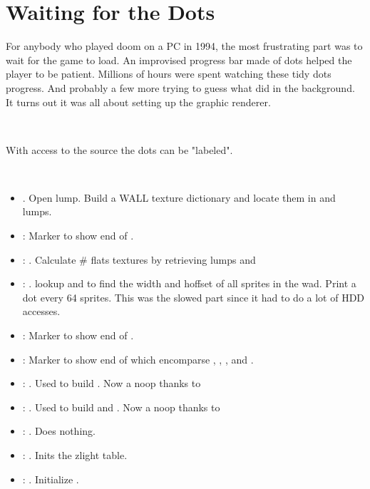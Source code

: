 \section{Waiting for the Dots}
For anybody who played doom on a PC in 1994, the most frustrating part was to wait for the game to load. An improvised progress bar made of dots helped the player to be patient. Millions of hours were spent watching these tidy dots progress. And probably a few more trying to guess what  did in the background. It turns out it was all about setting up the graphic renderer.\\
\par
{}\\
\par
With access to the source the dots can be "labeled".\\
\par
{}\\
\par
\begin{itemize}
\item {} . Open  lump. Build a WALL texture dictionary and locate them in  and  lumps.
\item {}: Marker to show end of .
\item {}: . Calculate \# flats textures by retrieving lumps  and 
\item {}: . lookup  and  to find the width and hoffset of all sprites in the wad. Print a dot every 64 sprites. This was the slowed part since it had to do a lot of HDD accesses.
\item {}: Marker to show end of . 
\item {}: Marker to show end of  which encomparse  , , , and .
\item {}: . Used to build . Now a noop thanks to 
\item {}: . Used to build  and . Now a noop thanks to 
\item {}: . Does nothing. 
\item {}: . Inits the zlight table.
\item {}: . Initialize .
\end{itemize}

